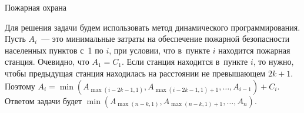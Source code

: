 \begin{tutorial}{Пожарная охрана}

Для решения задачи будем использовать метод динамического программирования. Пусть $A_i$~--- это минимальные затраты на обеспечение пожарной безопасности населенных пунктов с~1 по $i$, при условии, что в~пункте $i$ находится пожарная станция. Очевидно, что $A_1=C_1$. Если станция находится в~пункте $i$, то нужно, чтобы предыдущая станция находилась на расстоянии не превышающем $2k+1$. Поэтому $A_i = \min(A_{\max(i-2k-1,1)}, A_{\max(i-2k-1,1)+1}, \dots, A_{i-1}) + C_i$. Ответом задачи будет $\min(A_{\max(n-k,1)}, A_{\max(n-k,1)+1}, \dots, A_n)$.

\end{tutorial}
